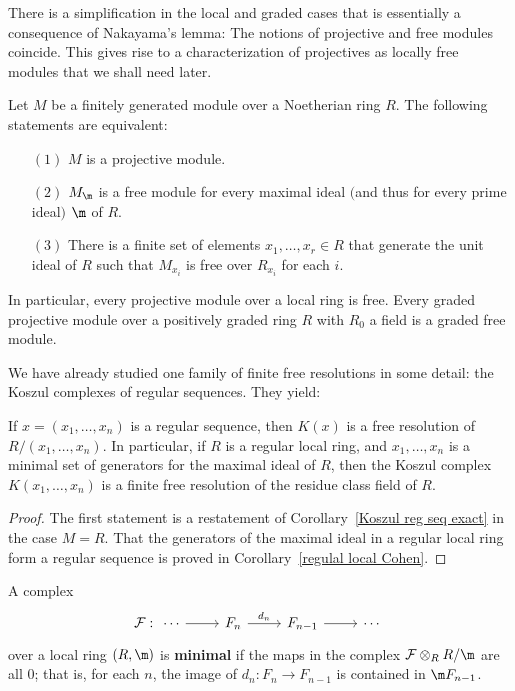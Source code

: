 There is a simplification in the local and graded cases that is essentially
a consequence of Nakayama's lemma: The notions of projective and free
modules coincide. This gives rise to a characterization of projectives as
locally free modules that we shall need later.
\begin{theorem}
Let $M$ be a finitely generated module over a Noetherian ring $R$. The following statements are equivalent:
\begin{itemize}
\item[$(1)$]$M$ is a projective module.
\item[$(2)$]$M_\m$ is a free module for every maximal ideal $($and thus for every prime ideal$)$ $\m$ of $R$.
\item[$(3)$]There is a finite set of elements $x_1,\dots,x_r\in R$ that generate the unit ideal of $R$ such that $M_{x_i}$ is free over $R_{x_i}$ for each $i$.
\end{itemize}
In particular, every projective module over a local ring is free. Every graded projective module over a positively graded ring $R$ with $R_0$ a field is a graded free module.
\end{theorem}
We have already studied one family of finite free resolutions in some detail: the Koszul complexes of regular sequences. They yield:
\begin{corollary}
If $x=(x_1,\dots,x_n)$ is a regular sequence, then $K(x)$ is a free resolution of $R/(x_1,\dots,x_n)$. In particular, if $R$ is a regular local ring, and $x_1,\dots,x_n$ is a minimal set of generators for the maximal ideal of $R$, then the Koszul complex $K(x_1,\dots,x_n)$ is a finite free resolution of the residue class field of $R$.
\end{corollary}
\begin{proof}
The first statement is a restatement of Corollary~\ref{Koszul reg seq exact} in the case $M=R$. That the generators of the maximal ideal in a regular local ring form a regular sequence is proved in Corollary~\ref{regulal local Cohen}.
\end{proof}
\begin{definition}
A complex
\[\mathcal{F}:\begin{tikzcd}
\cdots\ar[r]&F_n\ar[r,"d_n"]&F_{n-1}\ar[r]&\cdots
\end{tikzcd}\]
over a local ring $(R,\m)$ is \textbf{minimal} if the maps in the complex $\mathcal{F}\otimes_RR/\m$ are all $0$; that is, for each $n$, the image of $d_n:F_n\to F_{n-1}$ is contained in $\m F_{n-1}$.
\end{definition}
